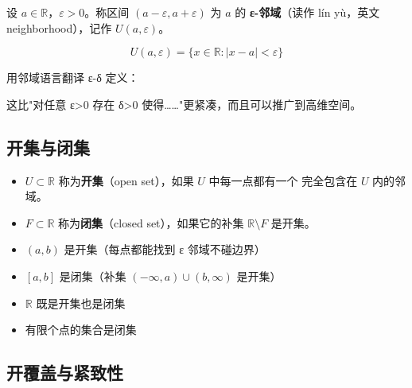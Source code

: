 \begin{definitionbox}[邻域]
设 \(a\in\mathbb{R}\)，\(\varepsilon>0\)。称区间 \((a-\varepsilon, a+\varepsilon)\) 为 \(a\) 的
\textbf{ε-邻域}（读作 lín yù，英文 neighborhood），记作 \(U(a,\varepsilon)\)。

\[
U(a,\varepsilon) = \{x\in\mathbb{R}: |x-a|<\varepsilon\}
\]
\end{definitionbox}

用邻域语言翻译 ε-δ 定义：

\begin{center}
\end{center}

这比"对任意 ε>0 存在 δ>0 使得……"更紧凑，而且可以推广到高维空间。

\subsection{开集与闭集}

\begin{definitionbox}[开集与闭集]
\begin{itemize}
  \item \(U\subset\mathbb{R}\) 称为\textbf{开集}（open set），如果 \(U\) 中每一点都有一个
        完全包含在 \(U\) 内的邻域。
  \item \(F\subset\mathbb{R}\) 称为\textbf{闭集}（closed set），如果它的补集 \(\mathbb{R}\setminus F\) 是开集。
\end{itemize}
\end{definitionbox}

\begin{examplebox}[8——开集和闭集的例子]
\begin{itemize}
  \item \((a,b)\) 是开集（每点都能找到 ε 邻域不碰边界）
  \item \([a,b]\) 是闭集（补集 \((-\infty,a)\cup(b,\infty)\) 是开集）
  \item \(\mathbb{R}\) 既是开集也是闭集
  \item 有限个点的集合是闭集
\end{itemize}
\end{examplebox}

\subsection{开覆盖与紧致性}

